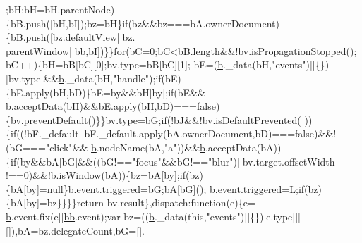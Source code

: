 \begin{DoxyCode}
      ;bH;bH=bH.parentNode)\{bB.push([bH,bI]);bz=bH\}\textcolor{keywordflow}{if}(bz&&bz===bA.ownerDocument)\{bB.push([bz.defaultView||bz.
      parentWindow||\hyperlink{docs_2_programmer's_manual_2html_2jquery_8js_a1d6558865876e1c8cca029fce41a4bdb}{bb},bI])\}\}\textcolor{keywordflow}{for}(bC=0;bC<bB.length&&!bv.isPropagationStopped();bC++)\{bH=bB[bC][0];bv.type=bB[bC][1];
      bE=(\hyperlink{docs_2_programmer's_manual_2html_2jquery_8js_aa4026ad5544b958e54ce5e106fa1c805}{b}.\_data(bH,\textcolor{stringliteral}{"events"})||\{\})[bv.type]&&\hyperlink{docs_2_programmer's_manual_2html_2jquery_8js_aa4026ad5544b958e54ce5e106fa1c805}{b}.\_data(bH,\textcolor{stringliteral}{"handle"});\textcolor{keywordflow}{if}(bE)\{bE.apply(bH,bD)\}bE=by&&bH[by];\textcolor{keywordflow}{if}(bE&&
      \hyperlink{docs_2_programmer's_manual_2html_2jquery_8js_aa4026ad5544b958e54ce5e106fa1c805}{b}.acceptData(bH)&&bE.apply(bH,bD)===\textcolor{keyword}{false})\{bv.preventDefault()\}\}bv.type=bG;\textcolor{keywordflow}{if}(!bJ&&!bv.isDefaultPrevented(
      ))\{\textcolor{keywordflow}{if}((!bF.\_default||bF.\_default.apply(bA.ownerDocument,bD)===\textcolor{keyword}{false})&&!(bG===\textcolor{stringliteral}{"click"}&&
      \hyperlink{docs_2_programmer's_manual_2html_2jquery_8js_aa4026ad5544b958e54ce5e106fa1c805}{b}.nodeName(bA,\textcolor{stringliteral}{"a"}))&&\hyperlink{docs_2_programmer's_manual_2html_2jquery_8js_aa4026ad5544b958e54ce5e106fa1c805}{b}.acceptData(bA))\{\textcolor{keywordflow}{if}(by&&bA[bG]&&((bG!==\textcolor{stringliteral}{"focus"}&&bG!==\textcolor{stringliteral}{"blur"})||bv.target.offsetWidth
      !==0)&&!\hyperlink{docs_2_programmer's_manual_2html_2jquery_8js_aa4026ad5544b958e54ce5e106fa1c805}{b}.isWindow(bA))\{bz=bA[by];\textcolor{keywordflow}{if}(bz)\{bA[by]=null\}\hyperlink{docs_2_programmer's_manual_2html_2jquery_8js_aa4026ad5544b958e54ce5e106fa1c805}{b}.event.triggered=bG;bA[bG]();
      \hyperlink{docs_2_programmer's_manual_2html_2jquery_8js_aa4026ad5544b958e54ce5e106fa1c805}{b}.event.triggered=\hyperlink{docs_2_programmer's_manual_2html_2jquery_8js_a38ee4c0b5f4fe2a18d0c783af540d253}{L};\textcolor{keywordflow}{if}(bz)\{bA[by]=bz\}\}\}\}\textcolor{keywordflow}{return} bv.result\},dispatch:\textcolor{keyword}{function}(e)\{e=
      \hyperlink{docs_2_programmer's_manual_2html_2jquery_8js_aa4026ad5544b958e54ce5e106fa1c805}{b}.event.fix(e||\hyperlink{docs_2_programmer's_manual_2html_2jquery_8js_a1d6558865876e1c8cca029fce41a4bdb}{bb}.event);var bz=((\hyperlink{docs_2_programmer's_manual_2html_2jquery_8js_aa4026ad5544b958e54ce5e106fa1c805}{b}.\_data(\textcolor{keyword}{this},\textcolor{stringliteral}{"events"})||\{\})[e.type]||[]),bA=bz.delegateCount,bG=[].

\end{DoxyCode}
